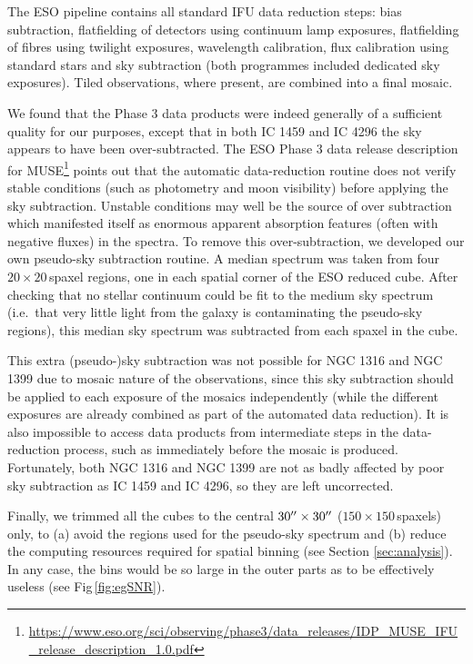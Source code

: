 		The ESO pipeline contains all standard IFU data reduction steps: bias subtraction, flatfielding of detectors using continuum lamp exposures, flatfielding of fibres using twilight exposures, wavelength calibration, flux calibration using standard stars and sky subtraction (both programmes included dedicated sky exposures). Tiled observations, where present, are combined into a final mosaic.

		We found that the Phase 3 data products were indeed generally of a sufficient quality for our purposes, except that in both IC 1459 and IC 4296 the sky appears to have been over-subtracted. The ESO Phase 3 data release description for MUSE\footnote{\url{https://www.eso.org/sci/observing/phase3/data\_releases/IDP\_MUSE\_IFU\_release\_description\_1.0.pdf}} points out that the automatic data-reduction routine does not verify stable conditions (such as photometry and moon visibility) before applying the sky subtraction. Unstable conditions may well be the source of over subtraction which manifested itself as enormous apparent absorption features (often with negative fluxes) in the spectra. To remove this over-subtraction, we developed our own pseudo-sky subtraction routine. A median spectrum was taken from four $20 \times 20$\,spaxel regions, one in each spatial corner of the ESO reduced cube. After checking that no stellar continuum could be fit to the medium sky spectrum (i.e.\ that very little light from the galaxy is contaminating the pseudo-sky regions), this median sky spectrum was subtracted from each spaxel in the cube. 

		This extra (pseudo-)sky subtraction was not possible for NGC 1316 and NGC 1399 due to mosaic nature of the observations, since this sky subtraction should be applied to each exposure of the mosaics independently (while the different exposures are already combined as part of the automated data reduction). It is also impossible to access data products from intermediate steps in the data-reduction process, such as immediately before the mosaic is produced. Fortunately, both NGC 1316 and NGC 1399 are not as badly affected by poor sky subtraction as IC 1459 and IC 4296, so they are left uncorrected. 

		Finally, we trimmed all the cubes to the central $30\hbox{$^{\prime\prime}$} \times 30\hbox{$^{\prime\prime}$}$ ($150 \times 150$\,spaxels) only, to (a) avoid the regions used for the pseudo-sky spectrum and (b) reduce the computing resources required for spatial binning (see Section \ref{sec:analysis}). In any case, the bins would be so large in the outer parts as to be effectively useless (see Fig\,\ref{fig:egSNR}).

